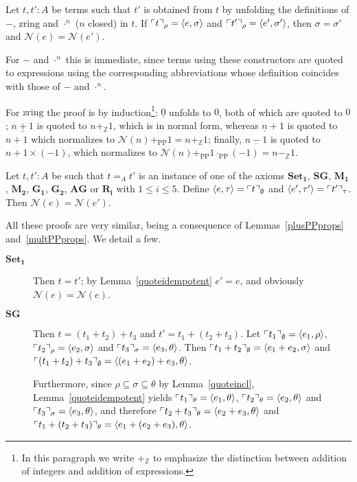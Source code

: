 \documentclass[numreferences]{kluwer}
\newcommand{\N}{\ensuremath{\mathcal{N}}}
\newcommand{\Z}{{\mathbb Z}}
\newcommand{\zring}{\ensuremath{\mathrm{zring}}}
\newcommand{\axiom}[1]{\ensuremath{\mathbf{#1}}}
\newcommand{\mlfn}[2]{\ensuremath\ulcorner{#1}\urcorner_{#2}}
\newcommand{\plusPP}{\ensuremath{+_{\mathrm{PP}}}}
\newcommand{\multPP}{\ensuremath{\cdot_{\mathrm{PP}}}}
\begin{document}
\begin{article}
\begin{lemma}\label{unfolding}
Let $t,t':A$ be terms such that $t'$ is obtained from $t$ by unfolding
the definitions of $-$, $\zring$ and $\cdot^n$ ($n$ closed) in $t$.
If $\mlfn{t}{\rho}=\langle e,\sigma\rangle$ and
$\mlfn{t'}{\rho}=\langle e',\sigma'\rangle$, then $\sigma=\sigma'$ and
$\N(e)=\N(e')$.
\end{lemma}
\begin{pf}
For $-$ and $\cdot^n$ this is immediate,
since terms using these constructors are quoted to expressions using the
corresponding abbreviations whose definition coincides with those of $-$
and $\cdot^n$.

For $\zring$ the proof is by induction\footnote{In this paragraph we
write $+_\Z$ to emphasize the distinction between addition of integers and
addition of expressions.}: $\underline0$ unfolds
to $0$, both of which are quoted to $0$; $\underline{n+1}$ is quoted to
$n+_\Z1$, which is in normal form, whereas $\underline{n}+1$ is quoted
to $n+1$ which normalizes to $\N(n)\plusPP1=n+_\Z1$; finally,
$\underline{n-1}$ is quoted to $n+1\times(-1)$, which normalizes to
$\N(n)\plusPP1\multPP(-1)=n-_\Z1$.
\end{pf}

\begin{lemma}\label{axioms}
Let $t,t':A$ be such that $t=_A t'$ is an instance of one of the axioms
\axiom{Set_1}, \axiom{SG}, \axiom{M_1}, \axiom{M_2}, \axiom{G_1}, \axiom{G_2},
\axiom{AG} or \axiom{R_i} with $1\leq i\leq5$.
Define
$\langle e,\tau\rangle=\mlfn{t}{\emptyset}$ and
$\langle e',\tau'\rangle=\mlfn{t'}{\tau}$.  Then $\N(e)=\N(e')$.
\end{lemma}
\begin{pf}
All these proofs are very similar, being a consequence of
Lemmas~\ref{plusPPprops} and~\ref{multPPprops}.  We detail a few.
\begin{description}
\item[\axiom{Set_1}] Then $t=t'$; by Lemma~\ref{quoteidempotent}
$e'=e$, and obviously $\N(e)=\N(e)$.
\item[\axiom{SG}] Then $t=(t_1+t_2)+t_3$ and $t'=t_1+(t_2+t_3)$.
Let $\mlfn{t_1}{\emptyset}=\langle e_1,\rho\rangle$,
$\mlfn{t_2}{\rho}=\langle e_2,\sigma\rangle$ and
$\mlfn{t_3}{\sigma}=\langle e_3,\theta\rangle$.  Then
$\mlfn{t_1+t_2}{\emptyset}=\langle e_1+e_2,\sigma\rangle$ and
$\mlfn{(t_1+t_2)+t_3}{\emptyset}=\langle (e_1+e_2)+e_3,\theta\rangle$.

Furthermore, since $\rho\subseteq\sigma\subseteq\theta$ by
Lemma~\ref{quoteincl}, Lemma~\ref{quoteidempotent} yields
$\mlfn{t_1}{\theta}=\langle e_1,\theta\rangle$,
$\mlfn{t_2}{\theta}=\langle e_2,\theta\rangle$ and
$\mlfn{t_3}{\sigma}=\langle e_3,\theta\rangle$, and therefore
$\mlfn{t_2+t_3}{\theta}=\langle e_2+e_3,\theta\rangle$ and
$\mlfn{t_1+(t_2+t_3)}{\theta}=\langle e_1+(e_2+e_3),\theta\rangle$.


\end{description}
\end{pf}
\end{article}
\end{document}
